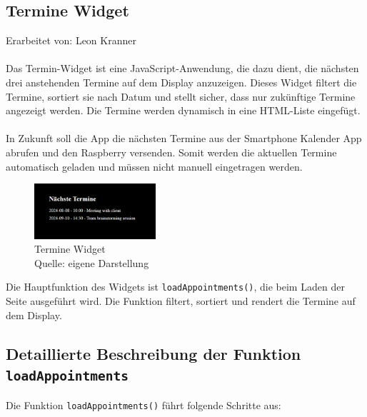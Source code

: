 \subsection{Termine Widget}
Erarbeitet von: Leon Kranner \\ \\

\noindent
Das Termin-Widget ist eine JavaScript-Anwendung, die dazu dient, die nächsten drei anstehenden Termine auf dem Display anzuzeigen. Dieses Widget filtert die Termine, sortiert sie nach Datum und stellt sicher, dass nur zukünftige Termine angezeigt werden. Die Termine werden dynamisch in eine HTML-Liste eingefügt. \\ \\
In Zukunft soll die App die nächsten Termine aus der Smartphone Kalender App abrufen und den Raspberry versenden. Somit werden die aktuellen Termine automatisch geladen und müssen nicht manuell eingetragen werden.

\begin{figure}[h]
    \centering
    \includegraphics[width=0.4\textwidth]{pictures/appointments_widget.png}
  \captionsetup{justification=centering, labelformat=simple, singlelinecheck=false}
    \caption[Termine Widget]{Termine Widget\\ Quelle: eigene Darstellung}
\end{figure}

\noindent
Die Hauptfunktion des Widgets ist \texttt{loadAppointments()}, die beim Laden der Seite ausgeführt wird. Die Funktion filtert, sortiert und rendert die Termine auf dem Display.

\subsection*{Detaillierte Beschreibung der Funktion \texttt{loadAppointments}}
Die Funktion \texttt{loadAppointments()} führt folgende Schritte aus:

